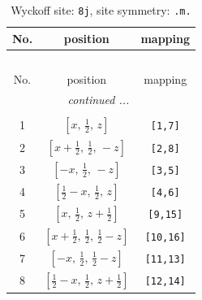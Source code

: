\documentclass[fleqn,8pt]{jsarticle}
\begin{document}
\begin{longtable}{ccc}
\caption{Wyckoff site: {\tt 8j}, site symmetry: {\tt .m.}}
 \\
 \hline \hline
No. & position & mapping \\ \hline \endfirsthead

\multicolumn{2}{l}{\tablename\ \thetable{}} \\
 \hline \hline
No. & position & mapping \\ \hline \endhead

 \hline \hline
\multicolumn{2}{r}{\footnotesize\it continued ...} \\ \endfoot

 \hline \hline
\multicolumn{2}{r}{} \\ \endlastfoot

1 & $\left[ x,\, \frac{1}{2},\, z \right]$ & {\tt [1,7]} \\ \hline
2 & $\left[ x + \frac{1}{2},\, \frac{1}{2},\, - z \right]$ & {\tt [2,8]} \\ \hline
3 & $\left[ - x,\, \frac{1}{2},\, - z \right]$ & {\tt [3,5]} \\ \hline
4 & $\left[ \frac{1}{2} - x,\, \frac{1}{2},\, z \right]$ & {\tt [4,6]} \\ \hline
5 & $\left[ x,\, \frac{1}{2},\, z + \frac{1}{2} \right]$ & {\tt [9,15]} \\ \hline
6 & $\left[ x + \frac{1}{2},\, \frac{1}{2},\, \frac{1}{2} - z \right]$ & {\tt [10,16]} \\ \hline
7 & $\left[ - x,\, \frac{1}{2},\, \frac{1}{2} - z \right]$ & {\tt [11,13]} \\ \hline
8 & $\left[ \frac{1}{2} - x,\, \frac{1}{2},\, z + \frac{1}{2} \right]$ & {\tt [12,14]} \\
\end{longtable}
\renewcommand{\arraystretch}{1.2}
\end{document}
